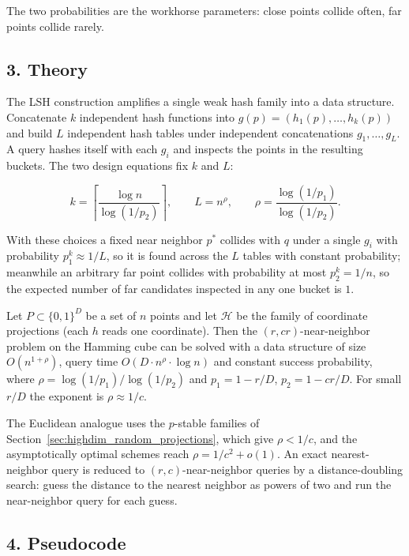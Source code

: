 The two probabilities are the workhorse parameters: close points collide
often, far points collide rarely.

\subsection{3. Theory}

The LSH construction amplifies a single weak hash family into a data
structure. Concatenate $k$ independent hash functions into
$g(p) = (h_1(p),\dots,h_k(p))$ and build $L$ independent hash tables under
independent concatenations $g_1,\dots,g_L$. A query hashes itself with each
$g_i$ and inspects the points in the resulting buckets. The two design
equations fix $k$ and $L$:

\[
k = \left\lceil \frac{\log n}{\log(1/p_2)} \right\rceil,
\qquad
L = n^{\rho},
\qquad
\rho = \frac{\log(1/p_1)}{\log(1/p_2)}.
\]

With these choices a fixed near neighbor $p^*$ collides with $q$ under a
single $g_i$ with probability $p_1^k \approx 1/L$, so it is found across the
$L$ tables with constant probability; meanwhile an arbitrary far point
collides with probability at most $p_2^k = 1/n$, so the expected number of far
candidates inspected in any one bucket is $1$.

\begin{theorem}
\label{thm:highdim_lsh_bound}
Let $P \subset \{0,1\}^D$ be a set of $n$ points and let
$\mathcal{H}$ be the family of coordinate projections (each $h$ reads one
coordinate). Then the $(r, cr)$-near-neighbor problem on the Hamming cube can
be solved with a data structure of size $O(n^{1+\rho})$, query time
$O(D \cdot n^{\rho} \cdot \log n)$ and constant success probability, where
$\rho = \log(1/p_1)/\log(1/p_2)$ and $p_1 = 1 - r/D$, $p_2 = 1 - c r / D$.
For small $r/D$ the exponent is $\rho \approx 1/c$.
\end{theorem}

The Euclidean analogue uses the $p$-stable families of
Section~\ref{sec:highdim_random_projections}, which give
$\rho < 1/c$, and the asymptotically optimal schemes
reach $\rho = 1/c^2 + o(1)$. An exact nearest-neighbor query is reduced to
$(r,c)$-near-neighbor queries by a distance-doubling search: guess the
distance to the nearest neighbor as powers of two and run the near-neighbor
query for each guess.

\subsection{4. Pseudocode}

